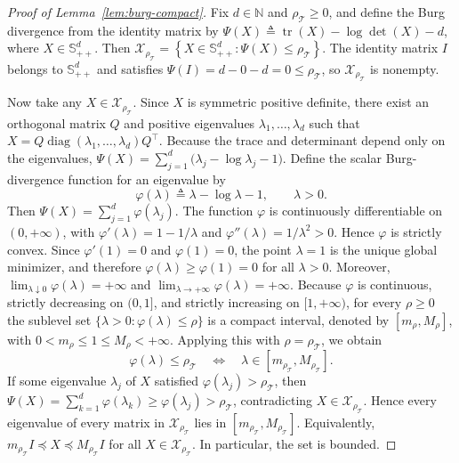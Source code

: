 \documentclass[11pt, letterpaper, oneside, reqno]{amsart}
\DeclareMathOperator{\Tr}{tr}
\newcommand{\Let}{\triangleq}
\begin{document}
\begin{proof}[Proof of Lemma~\ref{lem:burg-compact}]
Fix $d \in \mathbb N$ and $\rho_{\mathcal T} \ge 0$, and define the Burg divergence from the identity matrix by
$\Psi(X) \Let \Tr(X) - \log\det(X) - d$, where $X \in \mathbb S_{++}^d$.
Then $\mathcal X_{\rho_{\mathcal T}} = \left\{X \in \mathbb S_{++}^d : \Psi(X) \le \rho_{\mathcal T}\right\}$.
The identity matrix $I$ belongs to $\mathbb S_{++}^d$ and satisfies
$\Psi(I)=d-0-d=0\le \rho_{\mathcal T}$,
so $\mathcal X_{\rho_{\mathcal T}}$ is nonempty.

Now take any $X \in \mathcal X_{\rho_{\mathcal T}}$. Since $X$ is symmetric positive definite, there exist an orthogonal matrix $Q$ and positive eigenvalues $\lambda_1,\dots,\lambda_d$ such that
$X = Q \operatorname{diag}(\lambda_1,\dots,\lambda_d) Q^\top$.
Because the trace and determinant depend only on the eigenvalues,
$\Psi(X)
= \sum_{j=1}^d \bigl(\lambda_j - \log \lambda_j - 1\bigr)$.
Define the scalar Burg-divergence function for an eigenvalue by
\[
\varphi(\lambda) \Let \lambda - \log \lambda - 1,
\qquad \lambda>0.
\]
Then
$\Psi(X)=\sum_{j=1}^d \varphi(\lambda_j)$.
The function $\varphi$ is continuously differentiable on $(0, +\infty)$, with
$\varphi'(\lambda)=1-1/\lambda$
and
$\varphi''(\lambda)=1/{\lambda^2}>0$.
Hence $\varphi$ is strictly convex. Since $\varphi'(1)=0$ and $\varphi(1)=0$, the point $\lambda=1$ is the unique global minimizer, and therefore
$\varphi(\lambda)\ge \varphi(1) = 0$ for all $\lambda>0$.
Moreover,
$\lim_{\lambda\downarrow 0}\varphi(\lambda)=+\infty$ and $\lim_{\lambda\to+\infty}\varphi(\lambda)=+\infty$.
Because $\varphi$ is continuous, strictly decreasing on $(0,1]$, and strictly increasing on $[1, +\infty)$, for every $\rho\ge 0$ the sublevel set $\{\lambda>0:\varphi(\lambda)\le \rho\}$ is a compact interval, denoted by $[m_\rho,M_\rho]$, with
$0<m_\rho\le 1\le M_\rho<+\infty$.
Applying this with $\rho=\rho_{\mathcal T}$, we obtain
\[
\varphi(\lambda)\le \rho_{\mathcal T}
\quad\Longleftrightarrow\quad
\lambda\in [m_{\rho_{\mathcal T}},M_{\rho_{\mathcal T}}].
\]
If some eigenvalue $\lambda_j$ of $X$ satisfied $\varphi(\lambda_j)>\rho_{\mathcal T}$, then
$\Psi(X)=\sum_{k=1}^d \varphi(\lambda_k)\ge \varphi(\lambda_j)>\rho_{\mathcal T}$,
contradicting $X\in\mathcal X_{\rho_{\mathcal T}}$. Hence every eigenvalue of every matrix in $\mathcal X_{\rho_{\mathcal T}}$ lies in $[m_{\rho_{\mathcal T}},M_{\rho_{\mathcal T}}]$. Equivalently,
$m_{\rho_{\mathcal T}} I \preceq X \preceq M_{\rho_{\mathcal T}} I$ for all $X\in\mathcal X_{\rho_{\mathcal T}}$.
In particular, the set is bounded.


\end{proof}
\end{document}
